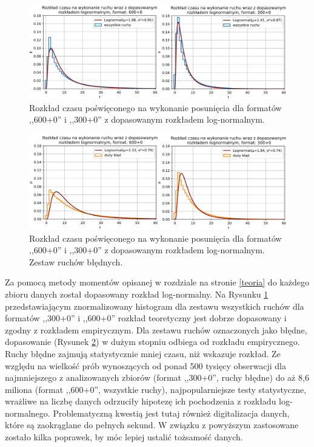 \documentclass[inzynierska]{pwr_wmat_praca_dyplomowa}
\theoremstyle{plain}
\numberwithin{theorem}{chapter}
\theoremstyle{definition}
\numberwithin{theorem}{chapter}
\begin{document}
\begin{figure}[h]
	\centering
	\includegraphics[width=\textwidth]{rozklad_lognorm.png}
	\caption{Rozkład czasu poświęconego na wykonanie posunięcia dla formatów ,,600+0'' i ,,300+0'' z dopasowanym rozkładem log-normalnym.}
	\label{rys:rozklad_lognorm}
\end{figure}
\begin{figure}[h]
	\centering
	\includegraphics[width=\textwidth]{rozklad_lognorm2.png}
	\caption{Rozkład czasu poświęconego na wykonanie posunięcia dla formatów ,,600+0'' i ,,300+0'' z dopasowanym rozkładem log-normalnym. Zestaw ruchów błędnych.}
	\label{rys:rozklad_lognorm2}
\end{figure}
Za pomocą metody momentów opisanej w rozdziale na stronie \ref{teoria} do każdego zbioru danych został dopasowany rozkład log-normalny. Na Rysunku \ref{rys:rozklad_lognorm} przedstawiającym znormalizowany histogram dla zestawu wszystkich ruchów dla formatów ,,300+0'' i ,,600+0'' rozkład teoretyczny jest dobrze dopasowany i zgodny z rozkładem empirycznym. Dla zestawu ruchów oznaczonych jako błędne, dopasowanie (Rysunek \ref{rys:rozklad_lognorm2}) w dużym stopniu odbiega od rozkładu empirycznego. Ruchy błędne zajmują statystycznie mniej czasu, niż wskazuje rozkład. Ze względu na wielkość prób wynoszących od ponad 500 tysięcy obserwacji dla najmniejszego z analizowanych zbiorów (format ,,300+0'', ruchy błędne) do aż 8,6 miliona (format ,,600+0'', wszystkie ruchy), najpopularniejsze testy statystyczne, wrażliwe na liczbę danych odrzuciły hipotezę ich pochodzenia z rozkładu log-normalnego. Problematyczną kwestią jest tutaj również digitalizacja danych, które są zaokrąglane do pełnych sekund. W związku z powyższym zastosowane zostało kilka poprawek, by móc lepiej ustalić tożsamość danych.
\end{document}
